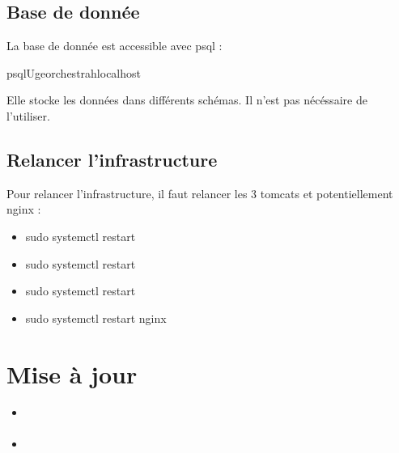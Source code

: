 \documentclass[letterpaper,10pt,french]{sphinxmanual}
\begin{document}
\subsection{Base de donnée}
\label{\detokenize{doc_instal/configuration:base-de-donnee}}
\sphinxAtStartPar
La base de donnée est accessible avec psql :

\begin{sphinxVerbatim}[commandchars=\\\{\}]
psql\PYGZhy{}Ugeorchestra\PYGZhy{}hlocalhost
\end{sphinxVerbatim}

\sphinxAtStartPar
Elle stocke les données dans différents schémas. Il n’est pas nécéssaire de l’utiliser.


\subsection{Relancer l’infrastructure}
\label{\detokenize{doc_instal/configuration:relancer-l-infrastructure}}
\sphinxAtStartPar
Pour relancer l’infrastructure, il faut relancer les 3 tomcats et potentiellement nginx :
\begin{itemize}
\item {} 
\sphinxAtStartPar
sudo systemctl restart 

\item {} 
\sphinxAtStartPar
sudo systemctl restart 

\item {} 
\sphinxAtStartPar
sudo systemctl restart 

\item {} 
\sphinxAtStartPar
sudo systemctl restart nginx

\end{itemize}

\sphinxstepscope


\section{Mise à jour}
\label{\detokenize{doc_instal/maj:mise-a-jour}}\label{\detokenize{doc_instal/maj::doc}}
\begin{sphinxShadowBox}
\begin{itemize}
\item {} 
\sphinxAtStartPar
{}\label{\detokenize{doc_instal/maj:id1}}{\hyperref[\detokenize{doc_instal/maj:introduction}]{}}

\item {} 
\sphinxAtStartPar
{}\label{\detokenize{doc_instal/maj:id2}}{\hyperref[\detokenize{doc_instal/maj:paquets-debians}]{}}

\end{itemize}
\end{sphinxShadowBox}
\end{document}
